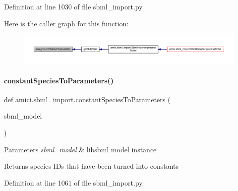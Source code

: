 Definition at line 1030 of file sbml\+\_\+import.\+py.

Here is the caller graph for this function\+:
\nopagebreak
\begin{figure}[H]
\begin{center}
\leavevmode
\includegraphics[width=350pt]{namespaceamici_1_1sbml__import_aaba72ac8b7d363e7720f36495ccc3285_icgraph}
\end{center}
\end{figure}
\mbox{\label{namespaceamici_1_1sbml__import_a9cee719122a45a0ac8590514a19ed5cc}} 
\paragraph{\texorpdfstring{constant\+Species\+To\+Parameters()}{constantSpeciesToParameters()}}
{\footnotesize\ttfamily def amici.\+sbml\+\_\+import.\+constant\+Species\+To\+Parameters (\begin{DoxyParamCaption}\item[{}]{sbml\+\_\+model }\end{DoxyParamCaption})}


\begin{DoxyParams}{Parameters}
{\em sbml\+\_\+model} & libsbml model instance\\
\hline
\end{DoxyParams}
\begin{DoxyReturn}{Returns}
species I\+Ds that have been turned into constants 
\end{DoxyReturn}


Definition at line 1061 of file sbml\+\_\+import.\+py.

\mbox{\label{namespaceamici_1_1sbml__import_a178c633ce1bc7f2af378ce56bd404541}} 
